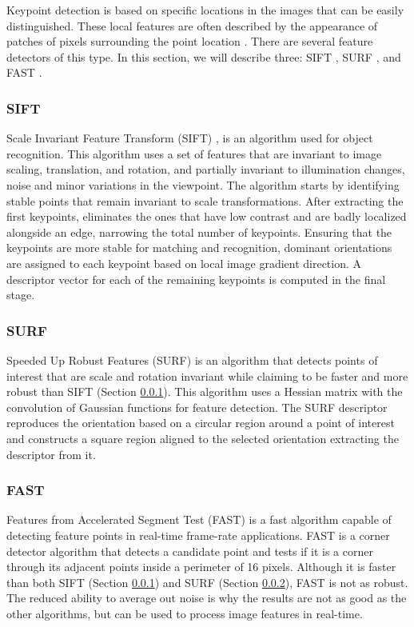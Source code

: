 Keypoint detection is based on specific locations in the images that can be easily distinguished. These local features are often described by the appearance of patches of pixels surrounding the point location \cite{szeliski2011computer}.
There are several feature detectors of this type. In this section, we will describe three: SIFT \cite{lowe1999object}, SURF \cite{bay2006surf}, and FAST \cite{rosten2006machine}.

\subsubsection{SIFT}
\label{subsub:sift}
Scale Invariant Feature Transform (SIFT) \cite{lowe1999object}, is an algorithm used for object recognition. This algorithm uses a set of features that are invariant to image scaling, translation, and rotation, and partially invariant to illumination changes, noise and minor variations in the viewpoint.
The algorithm starts by identifying stable points that remain invariant to scale transformations. After extracting the first keypoints, eliminates the ones that have low contrast and are badly localized alongside an edge, narrowing the total number of keypoints. Ensuring that the keypoints are more stable for matching and recognition, dominant orientations are assigned to each keypoint based on local image gradient direction. A descriptor vector for each of the remaining keypoints is computed in the final stage.

\subsubsection{SURF}
\label{subsub:surf}

Speeded Up Robust Features (SURF) \cite{bay2006surf} is an algorithm that detects points of interest that are scale and rotation invariant while claiming to be faster and more robust than SIFT (Section \ref{subsub:sift}). This algorithm uses a Hessian matrix with the convolution of Gaussian functions for feature detection. The SURF descriptor reproduces the orientation based on a circular region around a point of interest and constructs a square region aligned to the selected orientation extracting the descriptor from it.

\subsubsection{FAST}
\label{subsub:fast}

Features from Accelerated Segment Test (FAST) \cite{rosten2006machine} is a fast algorithm capable of detecting feature points in real-time frame-rate applications. FAST is a corner detector algorithm that detects a candidate point and tests if it is a corner through its adjacent points inside a perimeter of 16 pixels. Although it is faster than both SIFT (Section \ref{subsub:sift}) and SURF (Section \ref{subsub:surf}), FAST is not as robust. The reduced ability to average out noise is why the results are not as good as the other algorithms, but can be used to process image features in real-time.

